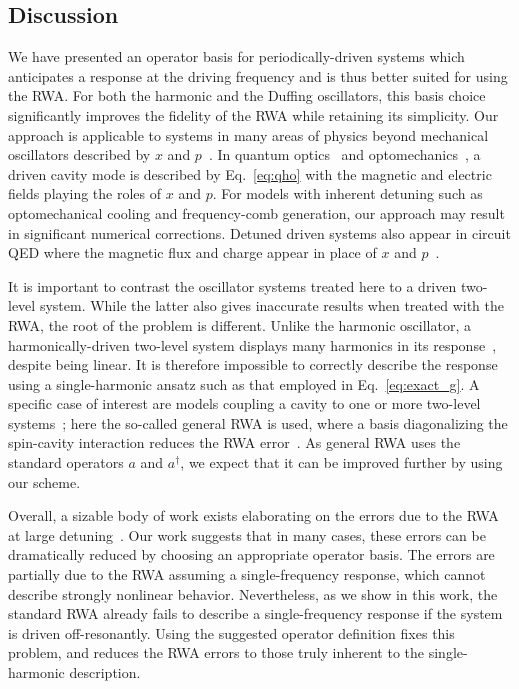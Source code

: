 \subsection{Discussion}
We have presented an operator basis for periodically-driven systems which anticipates a response at the driving frequency and is thus better suited for using the RWA. For both the harmonic and the Duffing oscillators, this basis choice significantly improves the fidelity of the RWA while retaining its simplicity. Our approach is applicable to systems in many areas of physics beyond mechanical oscillators described by $x$ and $p$~\cite{Bachtold_2022}. In quantum optics~\cite{Walls_Milburn} and optomechanics~\cite{Aspelmeyer_2014}, a driven cavity mode is described by Eq.~\eqref{eq:qho} with the magnetic and electric fields playing the roles of $x$ and $p$. For models with inherent detuning such as optomechanical cooling and frequency-comb generation, our approach may result in significant numerical corrections. Detuned driven systems also appear in circuit QED where the magnetic flux and charge appear in place of $x$ and $p$~\cite{Blais_2021}.

It is important to contrast the oscillator systems treated here to a driven two-level system. While the latter also gives inaccurate results when treated with the RWA, the root of the problem is different. Unlike the harmonic oscillator, a harmonically-driven two-level system displays many harmonics in its response~\cite{Zeuch_2020}, despite being linear. It is therefore impossible to correctly describe the response using a single-harmonic ansatz such as that employed in Eq.~\eqref{eq:exact_g}. A specific case of interest are models coupling a cavity to one or more two-level systems~\cite{Shore_1993,Kirton_2019}; here the so-called general RWA is used, where a basis diagonalizing the spin-cavity interaction reduces the RWA error~\cite{Irish_2007}. As general RWA uses the standard operators $a$ and $a^\dagger$, we expect that it can be improved further by using our scheme. 

Overall, a sizable body of work exists elaborating on the errors due to the RWA at large detuning~\cite{Baker_2018, Niemczyk_2010, Bishop_2010, Sornborger_2004}. Our work suggests that in many cases, these errors can be dramatically reduced by choosing an appropriate operator basis. The errors are partially due to the RWA assuming a single-frequency response, which cannot describe strongly nonlinear behavior. Nevertheless, as we show in this work, the standard RWA already fails to describe a single-frequency response if the system is driven off-resonantly. Using the suggested operator definition fixes this problem, and reduces the RWA errors to those truly inherent to the single-harmonic description.


